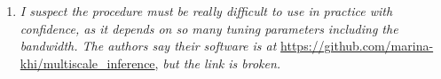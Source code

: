 \documentclass[a4paper,12pt]{article}
\begin{document}
\begin{enumerate}[label=\arabic*.,leftmargin=0.6cm]
    

\item \textit{I suspect the procedure must be really difficult to use in practice with confidence, as it depends on so many tuning parameters including the bandwidth. The authors say their software is at} \url{https://github.com/marina-khi/multiscale_inference}, \textit{but the link is broken.}


\end{enumerate}
\end{document}
